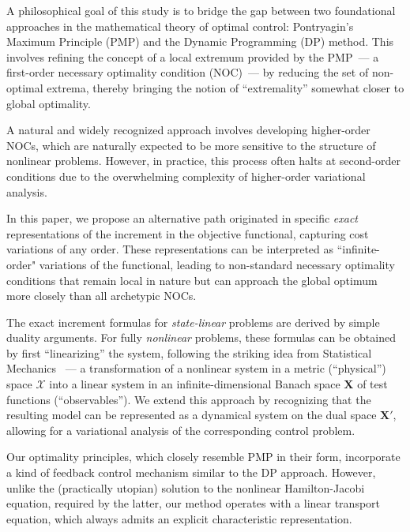\documentclass[sn-mathphys-num]{sn-jnl}
\numberwithin{equation}{section}
\theoremstyle{mythm}
\theoremstyle{mydef}
\begin{document}

A philosophical goal of this study is to bridge the gap between two foundational approaches in the mathematical theory of optimal control: Pontryagin's Maximum Principle (PMP) and the Dynamic Programming (DP) method. This involves refining the concept of a local extremum provided by the PMP~--- a first-order necessary optimality condition (NOC)~--- by reducing the set of non-optimal extrema, thereby bringing the notion of ``extremality'' somewhat closer to global optimality.

A natural and widely recognized approach involves developing higher-order NOCs, which are naturally expected to be more sensitive to the structure of nonlinear problems. However, in practice, this process often halts at second-order conditions due to the overwhelming complexity of higher-order variational analysis.

In this paper, we propose an alternative path originated in specific \emph{exact} representations of the increment in the objective functional, capturing cost variations of any order. These representations can be interpreted as ``infinite-order" variations of the functional, leading to non-standard necessary optimality conditions that remain local in nature but can approach the global optimum more closely than all archetypic NOCs. 

The exact increment formulas for \emph{state-linear} problems are derived by simple duality arguments. For fully \emph{nonlinear} problems, these formulas can be obtained by first ``linearizing'' the system, following the striking idea from Statistical Mechanics \cite{koopman1931hamiltonian}~--- a transformation of a nonlinear system in a metric (``physical'') space \( \mathcal{X} \) into a linear system in an infinite-dimensional Banach space \( \bm{X} \) of test functions (``observables''). We extend this approach by recognizing that the resulting model can be represented as a dynamical system on the dual space \( \bm{X}' \), allowing for a variational analysis of the corresponding control problem.


Our optimality principles, which closely resemble PMP in their form, incorporate a kind of feedback control mechanism similar to the DP approach. However, unlike the (practically utopian) solution to the nonlinear Hamilton-Jacobi equation, required by the latter, our method operates with a linear transport equation,  which always admits an explicit characteristic representation.
\end{document}
